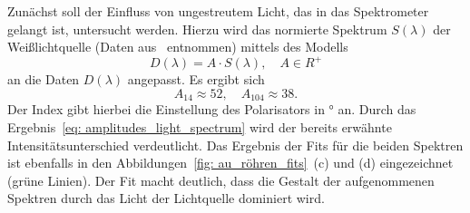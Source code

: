 Zunächst soll der Einfluss von ungestreutem Licht, das in das Spektrometer gelangt ist, untersucht werden.
Hierzu wird das normierte Spektrum $S(\lambda)$ der Weißlichtquelle (Daten aus~\cite{thorlabs} entnommen)
mittels des Modells
\begin{equation}
  D(\lambda) = A \cdot S(\lambda), \quad A \in R^{+}
  \label{eq: fit_light}
\end{equation}
an die Daten $D(\lambda)$ angepasst.
Es ergibt sich
\begin{equation}
  A_{14} \approx 52, \quad A_{104} \approx 38.
  \label{eq: amplitudes_light_spectrum}
\end{equation}
Der Index gibt hierbei die Einstellung des Polarisators in $\si{\degree}$ an.
Durch das Ergebnis~\eqref{eq: amplitudes_light_spectrum} wird der bereits erwähnte Intensitätsunterschied verdeutlicht.
Das Ergebnis der Fits für die beiden Spektren ist ebenfalls in den Abbildungen~\ref{fig: au_röhren_fits}~(c) und (d)
eingezeichnet (grüne Linien). Der Fit macht deutlich, dass die Gestalt der aufgenommenen Spektren
durch das Licht der Lichtquelle dominiert wird.

